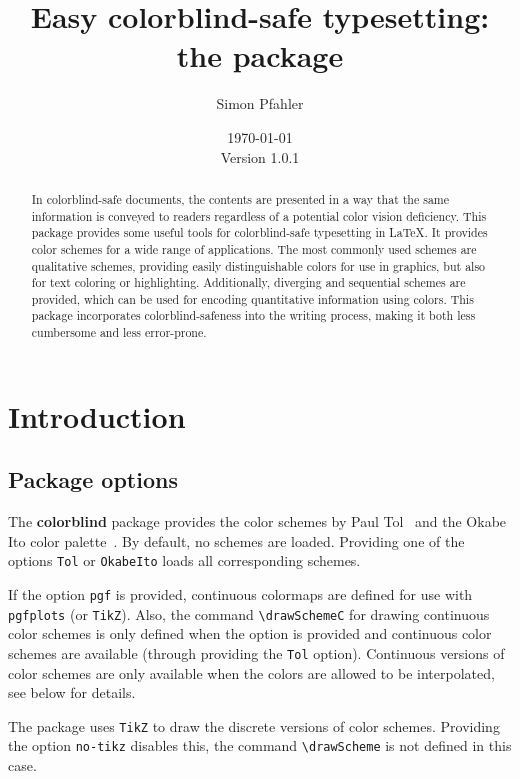 \documentclass{scrartcl}
\title{Easy colorblind-safe typesetting:\\ the \colorblind package}
\author{Simon Pfahler}
\date{\today\\Version 1.0.1}
\newcommand\colorblind{\textbf{colorblind} }
\newcommand\marg[1]{\leavevmode\marginpar{\raggedleft #1}}
\begin{document}
\maketitle

\begin{abstract}
    In colorblind-safe documents, the contents are presented in a way that the same information is conveyed to readers regardless of a potential color vision deficiency.
    This package provides some useful tools for colorblind-safe typesetting in \LaTeX.
    It provides color schemes for a wide range of applications.
    The most commonly used schemes are qualitative schemes, providing easily distinguishable colors for use in graphics, but also for text coloring or highlighting.
    Additionally, diverging and sequential schemes are provided, which can be used for encoding quantitative information using colors.
    This package incorporates colorblind-safeness into the writing process, making it both less cumbersome and less error-prone.
\end{abstract}

\tableofcontents
\clearpage

\section{Introduction}
\subsection{Package options}
\cprotect\marg{\verb!Tol!\\\verb!OkabeIto!}%
The \colorblind package provides the color schemes by Paul Tol~\cite{Tol} and the Okabe Ito color palette~\cite{Ichihara_2008}.
By default, no schemes are loaded.
Providing one of the options \verb!Tol! or \verb!OkabeIto! loads all corresponding schemes.

\cprotect\marg{\verb!pgf!}%
If the option \verb!pgf! is provided, continuous colormaps are defined for use with \verb!pgfplots! (or \verb!TikZ!).
Also, the command \verb!\drawSchemeC! for drawing continuous color schemes is only defined when the option is provided and continuous color schemes are available (through providing the \verb!Tol! option).
Continuous versions of color schemes are only available when the colors are allowed to be interpolated, see below for details.

\cprotect\marg{\verb!no-tikz!}%
The package uses \verb!TikZ! to draw the discrete versions of color schemes.
Providing the option \verb!no-tikz! disables this, the command \verb!\drawScheme! is not defined in this case.
\end{document}
